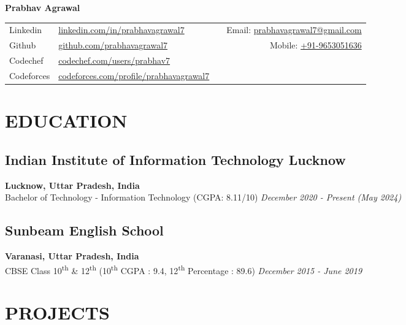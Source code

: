 \documentclass[12pt]{article}
\newcommand{\resumename}[1]{\LARGE\textbf{#1}\small}
\begin{document}
\resumename{Prabhav Agrawal}
\vspace*{-6pt}
\begin{table}[h]
	\centering
	\begin{tabularx}{\textwidth}{@{}llXr}
		Linkedin & \href{https://linkedin.com/in/prabhavagrawal7}{linkedin.com/in/prabhavagrawal7} &   & Email: \href{mailto:prabhavagrawal7@gmail.com}{prabhavagrawal7@gmail.com} \\
		Github   & \href{https://github.com/prabhavagrawal7}{github.com/prabhavagrawal7}           &   & Mobile: \href{tel:+919653051636}{+91-9653051636}                          \\
		Codechef & \href{https://codechef.com/users/prabhav7}{codechef.com/users/prabhav7} \\
		Codeforces & \href{https://codeforces.com/profile/prabhavagrawal7}{codeforces.com/profile/prabhavagrawal7} &                                                               \\
	\end{tabularx}
\end{table}
\vspace{-\topsep}
\vspace*{-5pt}
\section*{EDUCATION}
\subsection*{Indian Institute of Information Technology Lucknow}	\hfill\textbf{Lucknow, Uttar Pradesh, India} \\
Bachelor of Technology - Information Technology (CGPA: 8.11/10) 	\hfill\textit{December 2020 - Present (May 2024)} \\
\subsection*{Sunbeam English School}	\hfill\textbf{Varanasi, Uttar Pradesh, India} \\
CBSE Class 10\textsuperscript{th} \& 12\textsuperscript{th} (10\textsuperscript{th} CGPA : 9.4, 12\textsuperscript{th} Percentage : 89.6) \hfill \textit{December 2015 - June 2019} \\

\section*{PROJECTS}
\end{document}
